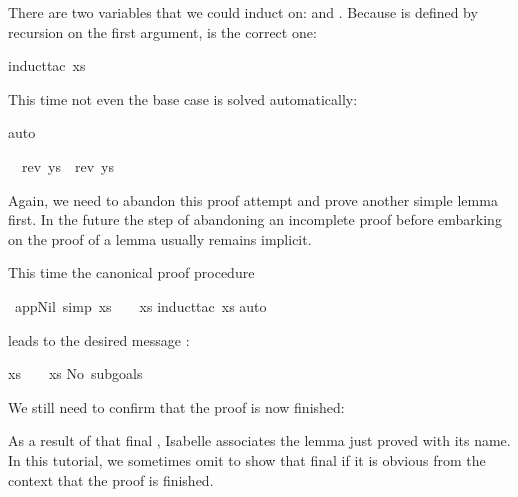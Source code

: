 \begin{isabellebody}
\begin{isamarkuptxt}
There are two variables that we could induct on:  and
. Because \isa{{\isacharat}} is defined by recursion on
the first argument,  is the correct one:%
\end{isamarkuptxt}%
induct{\isacharunderscore}tac\ xs{\isacharparenright}%
\begin{isamarkuptxt}%
\noindent
This time not even the base case is solved automatically:%
\end{isamarkuptxt}%
auto{\isacharparenright}%
\begin{isamarkuptxt}%
\begin{isabelle}%
\ {}{\isachardot}\ rev\ ys\ {\isacharequal}\ rev\ ys\ {\isacharat}\ {\isacharbrackleft}{\isacharbrackright}%
\end{isabelle}
Again, we need to abandon this proof attempt and prove another simple lemma
first. In the future the step of abandoning an incomplete proof before
embarking on the proof of a lemma usually remains implicit.%
\end{isamarkuptxt}%
%
%
\begin{isamarkuptext}%
This time the canonical proof procedure%
\end{isamarkuptext}%
\ app{\isacharunderscore}Nil{}\ {\isacharbrackleft}simp{\isacharbrackright}{\isacharcolon}\ {\isachardoublequote}xs\ {\isacharat}\ {\isacharbrackleft}{\isacharbrackright}\ {\isacharequal}\ xs{\isachardoublequote}\isanewline
{}induct{\isacharunderscore}tac\ xs{\isacharparenright}\isanewline
{}auto{\isacharparenright}%
\begin{isamarkuptxt}%
\noindent
leads to the desired message :
\begin{isabelle}%
xs\ {\isacharat}\ {\isacharbrackleft}{\isacharbrackright}\ {\isacharequal}\ xs\isanewline
No\ subgoals{\isacharbang}%
\end{isabelle}
We still need to confirm that the proof is now finished:%
\end{isamarkuptxt}%
%
\begin{isamarkuptext}%
\noindent{}%
As a result of that final , Isabelle associates the lemma just proved
with its name. In this tutorial, we sometimes omit to show that final 
if it is obvious from the context that the proof is finished.


\end{isamarkuptext}
\end{isabellebody}
